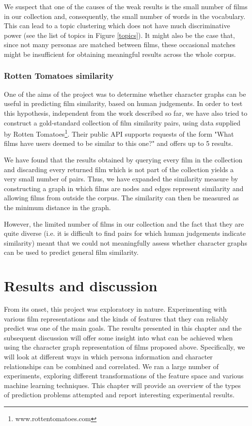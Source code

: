 \documentclass[bsc,frontabs,singlespacing,parskip]{infthesis} %
\begin{document}
We suspect that one of the causes of the weak results is the small number of films in our collection and, consequently, the small number of words in the vocabulary. This can lead to a topic clustering which does not have much discriminative power (see the list of topics in Figure \ref{topics}). It might also be the case that, since not many personas are matched between films, these occasional matches might be insufficient for obtaining meaningful results across the whole corpus.

\subsection{Rotten Tomatoes similarity}
One of the aims of the project was to determine whether character graphs can be useful in predicting film similarity, based on human judgements. In order to test this hypothesis, independent from the work described so far, we have also tried to construct a gold-standard collection of film similarity pairs, using data supplied by Rotten Tomatoes\footnote{www.rottentomatoes.com}. Their public API supports requests of the form "What films have users deemed to be similar to this one?" and offers up to 5 results.

We have found that the results obtained by querying every film in the collection and discarding every returned film which is not part of the collection yields a very small number of pairs. Thus, we have expanded the similarity measure by constructing a graph in which films are nodes and edges represent similarity and allowing films from outside the corpus. The similarity can then be measured as the minimum distance in the graph.

However, the limited number of films in our collection and the fact that they are quite diverse (i.e. it is difficult to find pairs for which human judgements indicate similarity) meant that we could not meaningfully assess whether character graphs can be used to predict general film similarity. 

\chapter{Results and discussion}
\label{chap:results}

From its onset, this project was exploratory in nature. Experimenting with various film representations and the kinds of features that they can reliably predict was one of the main goals. The results presented in this chapter and the subsequent discussion will offer some insight into what can be achieved when using the character graph representation of films proposed above. Specifically, we will look at different ways in which persona information and character relationships can be combined and correlated. We ran a large number of experiments, exploring different transformations of the feature space and various machine learning techniques. This chapter will provide an overview of the types of prediction problems attempted and report interesting experimental results.
\end{document}
